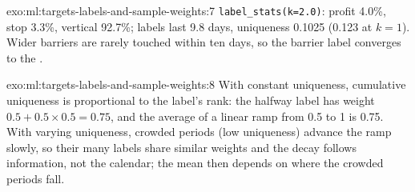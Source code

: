 \begin{solution}{exo:ml:targets-labels-and-sample-weights:7}
\texttt{label\_stats(k=2.0)}: profit 4.0\%, stop 3.3\%, vertical 92.7\%; labels last 9.8 days, uniqueness 0.1025
(0.123 at $k = 1$). Wider barriers are rarely touched within ten days, so the barrier label converges to the
.
\end{solution}

\begin{solution}{exo:ml:targets-labels-and-sample-weights:8}
With constant uniqueness, cumulative uniqueness is proportional to the label's rank: the halfway label has weight
$0.5 + 0.5\times0.5 = 0.75$, and the average of a linear ramp from 0.5 to 1 is 0.75. With varying uniqueness, crowded
periods (low uniqueness) advance the ramp slowly, so their many labels share similar weights and the decay follows
information, not the calendar; the mean then depends on where the crowded periods fall.
\end{solution}

